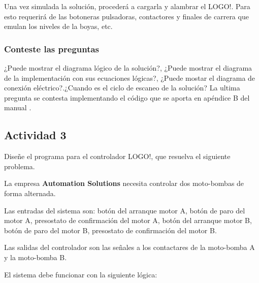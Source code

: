 Una vez simulada la solución, procederá a cargarla y alambrar el LOGO!. Para esto requerirá de las botoneras pulsadoras, contactores y finales de carrera que emulan los niveles de la boyas, etc. 



\subsubsection{Conteste las preguntas}

¿Puede mostrar el diagrama lógico de la solución?, ¿Puede mostrar el diagrama de la implementación con sus  ecuaciones lógicas?, ¿Puede mostar el diagrama de conexión eléctrico?.¿Cuando es el ciclo de escaneo de la solución? La ultima pregunta se contesta implementando el código que se aporta en apéndice B del manual \cite{LOGO1}.

\subsection{Actividad 3}
Diseñe el programa para el controlador LOGO!, que resuelva el siguiente problema.

La empresa \textbf{Automation Solutions} necesita controlar dos moto-bombas de forma alternada.

Las entradas del sistema son:  botón del arranque motor A, botón de paro del motor A,  presostato de confirmación del motor A, botón del arranque motor B, botón de paro del motor B,  presostato de confirmación del motor B. 

Las salidas del controlador son las señales a los contactares de la moto-bomba A y la moto-bomba B.

El sistema debe funcionar con la siguiente lógica:

